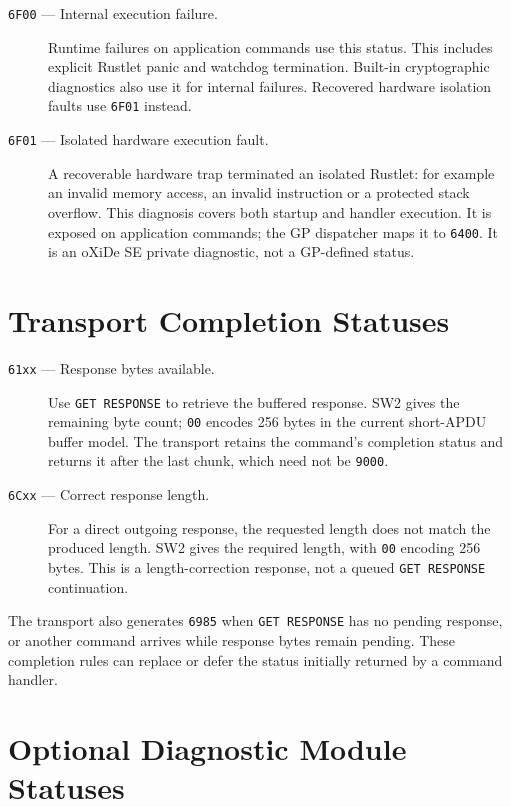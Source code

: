 \begin{description}
\item[\texttt{6F00} --- Internal execution failure.]
Runtime failures on application commands use this status. This includes
explicit Rustlet panic and watchdog termination. Built-in cryptographic diagnostics also
use it for internal failures. Recovered hardware isolation faults use
\texttt{6F01} instead.

\item[\texttt{6F01} --- Isolated hardware execution fault.]
A recoverable hardware trap terminated an isolated Rustlet: for example an
invalid memory access, an invalid instruction or a protected stack overflow.
This diagnosis covers both startup and handler execution. It is exposed on
application commands; the GP dispatcher maps it to \texttt{6400}.
It is an oXiDe SE private diagnostic, not a GP-defined status.
\end{description}

\section{Transport Completion Statuses}

\begin{description}
\item[\texttt{61xx} --- Response bytes available.]
Use \texttt{GET RESPONSE} to retrieve the buffered response.
SW2 gives the remaining byte count; \texttt{00} encodes 256 bytes in the
current short-APDU buffer model. The transport retains the command's completion
status and returns it after the last chunk, which need not be \texttt{9000}.

\item[\texttt{6Cxx} --- Correct response length.]
For a direct outgoing response, the requested length does not match the
produced length. SW2 gives the required length, with \texttt{00} encoding
256 bytes. This is a length-correction response, not a queued
\texttt{GET RESPONSE} continuation.
\end{description}

The transport also generates \texttt{6985} when \texttt{GET RESPONSE} has no
pending response, or another command arrives while response bytes remain
pending. These completion rules can replace or defer the status initially
returned by a command handler.

\section{Optional Diagnostic Module Statuses}

